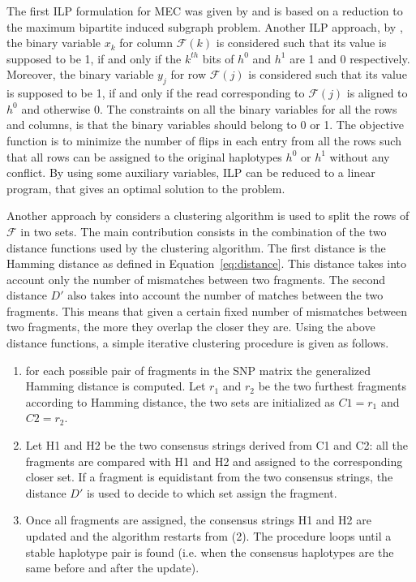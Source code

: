 The first ILP formulation for MEC was given by \cite{FM12_solving} and is based on a reduction to the maximum bipartite induced subgraph problem. 
Another ILP approach, by \cite{Chen2013}, the binary variable $x_k$ for column $\mathcal{F}(k)$ 
is considered such that its value is supposed to be 1, if and only if the $k^{th}$ bits of $h^0$ and $h^1$ are 1 and 0 respectively.
Moreover, the binary variable $y_j$ for row $\mathcal{F}(j)$ is considered such that its value is supposed to be 1, if and only 
if the read corresponding to $\mathcal{F}(j)$ is aligned to $h^0$ and otherwise 0.
The constraints on all the binary variables for all the rows and columns, is that the binary variables should belong to 0 or 1.
The objective function is to minimize the number of flips in each entry from all the rows such that all rows can be assigned to the original haplotypes $h^0$ or $h^1$ without any conflict. 
By using some auxiliary variables, ILP can be reduced to a linear program, that gives an optimal solution to the problem.

Another approach by \citep{wang2007clustering} considers a clustering algorithm is used to split the rows of $\mathcal{F}$ in two sets. 
The main contribution consists in the combination of the two distance functions used by the clustering algorithm. 
The first distance is the Hamming distance as defined in Equation~\ref{eq:distance}. This distance takes into account only the number of mismatches between two fragments. 
The second distance $D'$ also takes into account the number of matches between the two fragments.
This means that given a certain fixed number of mismatches between two fragments, the more they overlap the closer they are.
Using the above distance functions, a simple iterative clustering procedure is given as follows.
\begin{enumerate}
 \item for each possible pair of fragments in the SNP matrix the generalized Hamming distance is computed. Let $r_1$ and $r_2$ be the two furthest fragments according to Hamming distance, the two sets are initialized as $C1 = r_1$ and $C2 = r_2$.
  \item Let H1 and H2 be the two consensus strings derived from C1 and C2: all the fragments are compared with H1 and H2 and assigned to the corresponding closer set. If a fragment is equidistant from the two consensus strings, the distance $D'$ is used to decide to which set assign the fragment.
  \item Once all fragments are assigned, the consensus strings H1 and H2 are updated and the algorithm restarts from (2). The procedure loops until a stable haplotype pair is found (i.e. when the consensus haplotypes are the same before and after the update).
\end{enumerate}

